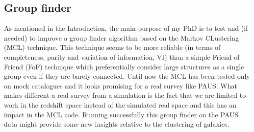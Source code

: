 \documentclass[letterpaper]{article}
\begin{document}
\subsection{Group finder}
\label{sub:group}
As mentioned in the Introduction, the main purpose of my PhD is to test and (if needed) to improve a group finder algorithm based on the Markov CLustering (MCL) technique. This technique seems to be more reliable (in terms of completeness, purity and variation of information, VI) than a simple Friend of Friend (FoF) technique which preferentially consider large structures as a single group even if they are barely connected. Until now the MCL has been tested only on mock catalogues and it looks promising for a real survey like PAUS. What makes different a real survey from a simulation is the fact that we are limited to work in the redshift space instead of the simulated real space and this has an impact in the MCL code. Running successfully this group finder on the PAUS data might provide some new insights relative to the clustering of galaxies.

















\end{document}

